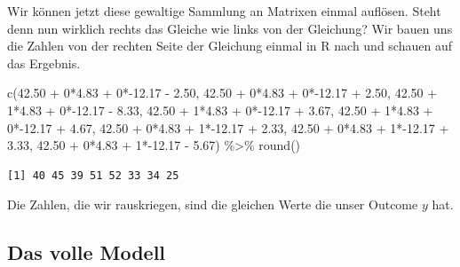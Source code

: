 \documentclass[
  letterpaper,
]{scrbook}
\newenvironment{Shaded}{\begin{snugshade}}{\end{snugshade}}
\newcommand{\DecValTok}[1]{\textcolor[rgb]{0.68,0.00,0.00}{#1}}
\newcommand{\FloatTok}[1]{\textcolor[rgb]{0.68,0.00,0.00}{#1}}
\newcommand{\FunctionTok}[1]{\textcolor[rgb]{0.28,0.35,0.67}{#1}}
\newcommand{\NormalTok}[1]{\textcolor[rgb]{0.00,0.23,0.31}{#1}}
\newcommand{\SpecialCharTok}[1]{\textcolor[rgb]{0.37,0.37,0.37}{#1}}
\begin{document}
Wir können jetzt diese gewaltige Sammlung an Matrixen einmal auflösen.
Steht denn nun wirklich rechts das Gleiche wie links von der Gleichung?
Wir bauen uns die Zahlen von der rechten Seite der Gleichung einmal in R
nach und schauen auf das Ergebnis.

\begin{Shaded}
\begin{Highlighting}[]
\FunctionTok{c}\NormalTok{(}\FloatTok{42.50} \SpecialCharTok{+} \DecValTok{0}\SpecialCharTok{*}\FloatTok{4.83} \SpecialCharTok{+} \DecValTok{0}\SpecialCharTok{*{-}}\FloatTok{12.17} \SpecialCharTok{{-}} \FloatTok{2.50}\NormalTok{,}
  \FloatTok{42.50} \SpecialCharTok{+} \DecValTok{0}\SpecialCharTok{*}\FloatTok{4.83} \SpecialCharTok{+} \DecValTok{0}\SpecialCharTok{*{-}}\FloatTok{12.17} \SpecialCharTok{+} \FloatTok{2.50}\NormalTok{,}
  \FloatTok{42.50} \SpecialCharTok{+} \DecValTok{1}\SpecialCharTok{*}\FloatTok{4.83} \SpecialCharTok{+} \DecValTok{0}\SpecialCharTok{*{-}}\FloatTok{12.17} \SpecialCharTok{{-}} \FloatTok{8.33}\NormalTok{,}
  \FloatTok{42.50} \SpecialCharTok{+} \DecValTok{1}\SpecialCharTok{*}\FloatTok{4.83} \SpecialCharTok{+} \DecValTok{0}\SpecialCharTok{*{-}}\FloatTok{12.17} \SpecialCharTok{+} \FloatTok{3.67}\NormalTok{,}
  \FloatTok{42.50} \SpecialCharTok{+} \DecValTok{1}\SpecialCharTok{*}\FloatTok{4.83} \SpecialCharTok{+} \DecValTok{0}\SpecialCharTok{*{-}}\FloatTok{12.17} \SpecialCharTok{+} \FloatTok{4.67}\NormalTok{,}
  \FloatTok{42.50} \SpecialCharTok{+} \DecValTok{0}\SpecialCharTok{*}\FloatTok{4.83} \SpecialCharTok{+} \DecValTok{1}\SpecialCharTok{*{-}}\FloatTok{12.17} \SpecialCharTok{+} \FloatTok{2.33}\NormalTok{,}
  \FloatTok{42.50} \SpecialCharTok{+} \DecValTok{0}\SpecialCharTok{*}\FloatTok{4.83} \SpecialCharTok{+} \DecValTok{1}\SpecialCharTok{*{-}}\FloatTok{12.17} \SpecialCharTok{+} \FloatTok{3.33}\NormalTok{,}
  \FloatTok{42.50} \SpecialCharTok{+} \DecValTok{0}\SpecialCharTok{*}\FloatTok{4.83} \SpecialCharTok{+} \DecValTok{1}\SpecialCharTok{*{-}}\FloatTok{12.17} \SpecialCharTok{{-}} \FloatTok{5.67}\NormalTok{) }\SpecialCharTok{\%\textgreater{}\%} \FunctionTok{round}\NormalTok{()}
\end{Highlighting}
\end{Shaded}

\begin{verbatim}
[1] 40 45 39 51 52 33 34 25
\end{verbatim}

Die Zahlen, die wir rauskriegen, sind die gleichen Werte die unser
Outcome \(y\) hat.

\hypertarget{das-volle-modell}{%
\subsection{Das volle Modell}\label{das-volle-modell}}
\end{document}
